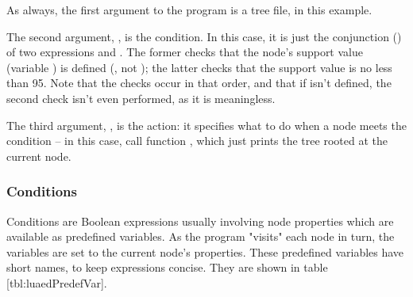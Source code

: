As always, the first argument to the program is a tree file,
 in this example.

The second argument, , is the condition.  In this
case, it is just the conjunction () of two expressions
 and .  The former checks that the node's support
value (variable ) is defined (\ie, not ); the latter
checks that the support value is no less than 95. Note that the checks occur in
that order, and that if  isn't defined, the second check isn't even
performed, as it is meaningless.

The third argument, , is the action: it specifies what to do when a
node meets the condition -- in this case, call function ,
which just prints the tree rooted at the current node.

\subsubsection{Conditions}

Conditions are Boolean expressions usually involving node properties which are
available as predefined variables. As the program "visits" each node in turn,
the variables are set to the current node's properties.  These predefined
variables have short names, to keep expressions concise. They are shown in table
\in{}[tbl:luaedPredefVar].



